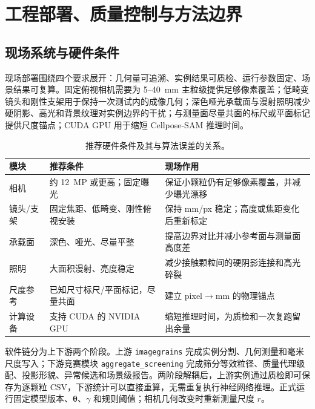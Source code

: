 \section{工程部署、质量控制与方法边界}
\label{sec:r-deploy-final}

\subsection{现场系统与硬件条件}

现场部署围绕四个要求展开：几何量可追溯、实例结果可质检、运行参数固定、场景结果可复算。固定俯视相机需要为 5--40~mm 主粒级提供足够像素覆盖；低畸变镜头和刚性支架用于保持一次测试内的成像几何；深色哑光承载面与漫射照明减少硬阴影、高光和背景纹理对实例边界的干扰；与测量面尽量共面的标尺或平面标记提供尺度锚点；CUDA GPU 用于缩短 Cellpose-SAM 推理时间。

\begin{table}[H]
\centering
\caption{推荐硬件条件及其与算法误差的关系。}
\label{tab:r-final-hardware}
\footnotesize
\renewcommand{\arraystretch}{1.12}
\begin{tabular}{>{\raggedright\arraybackslash}p{2.0cm}>{\raggedright\arraybackslash}p{4.0cm}>{\raggedright\arraybackslash}p{6.5cm}}
\toprule
模块 & 推荐条件 & 现场作用 \\
\midrule
相机 & 约 12~MP 或更高；固定曝光 & 保证小颗粒仍有足够像素覆盖，并减少曝光漂移 \\
镜头/支架 & 固定焦距、低畸变、刚性俯视安装 & 保持 mm/px 稳定；高度或焦距变化后重新标定 \\
承载面 & 深色、哑光、尽量平整 & 提高边界对比并减小参考面与测量面高度差 \\
照明 & 大面积漫射、亮度稳定 & 减少接触颗粒间的硬阴影连接和高光碎裂 \\
尺度参考 & 已知尺寸标尺/平面标记，尽量共面 & 建立 pixel$\rightarrow$mm 的物理锚点 \\
计算设备 & 支持 CUDA 的 NVIDIA GPU & 缩短推理时间，为质检和一次复跑留出余量 \\
\bottomrule
\end{tabular}
\end{table}

软件链分为上下游两个阶段。上游 \texttt{imagegrains} 完成实例分割、几何测量和毫米尺度写入；下游竞赛模块 \texttt{aggregate\_screening} 完成筛分等效粒径、质量代理级配、投影形貌、异常候选和场景级报告。两阶段解耦后，上游实例通过质检即可保存为逐颗粒 CSV，下游统计可以直接重算，无需重复执行神经网络推理。正式运行固定模型版本、$\boldsymbol{\theta}$、$\gamma$ 和规则阈值；相机几何改变时重新测量尺度 $r$。


